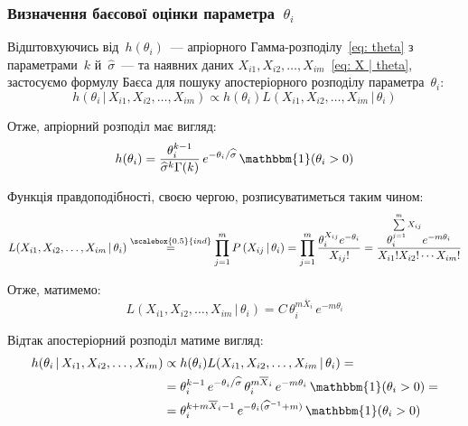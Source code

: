 \subsubsection*{Визначення баєсової оцінки параметра~$\theta_i$}

Відштовхуючись від~$h(\theta_i)$~--- апріорного Гамма-розподілу~\eqref{eq: theta} з параметрами~$k$ й~$\widehat{\sigma}$~--- та наявних даних $X_{i1},X_{i2},\ldots,X_{im}$~\eqref{eq: X | theta}, застосуємо формулу Баєса для пошуку апостеріорного розподілу параметра~$\theta_i:$
\begin{equation}
    h(\theta_i \,|\, X_{i1},X_{i2},\ldots,X_{im}) \propto h(\theta_i) L(X_{i1},X_{i2},\ldots,X_{im} \,|\, \theta_i)
\end{equation}

Отже, апріорний розподіл має вигляд:
\begin{equation}
    h(\theta_i) = \frac{\theta_{i}^{k-1}}{\widehat{\sigma}^{k}\Gamma(k)}\, e^{-\theta_{i}/\widehat{\sigma}}\, \mathbbm{1}(\theta_{i}>0)
\end{equation}

Функція правдоподібності, своєю чергою, розписуватиметься таким чином: 
\begin{equation}
    L(X_{i1},X_{i2},\ldots,X_{im} \,|\, \theta_i) \overset{\scalebox{0.5}{ind}}{=} \prod\limits_{j=1}^{m} P\left( X_{ij} \,|\, \theta_{i} \right) = \prod\limits_{j=1}^{m} \frac{\theta_{i}^{X_{ij}}e^{-\theta_{i}}}{X_{ij}!} = \frac{\theta_{i}^{\sum\limits_{j=1}^{m}X_{ij}}e^{-m\theta_{i}}}{X_{i1}!X_{i2}! \cdots X_{im}!}
\end{equation}

Отже, матимемо:
\begin{equation}
    L(X_{i1},X_{i2},\ldots,X_{im} \,|\, \theta_i) = C\, \theta_{i}^{m\overline{X}_i}\, e^{-m\theta_{i}}
\end{equation}

Відтак апостеріорний розподіл матиме вигляд:
\begin{align}
    h(\theta_i \,|\, X_{i1},X_{i2},\ldots,X_{im}) &\propto h(\theta_i) L(X_{i1},X_{i2},\ldots,X_{im} \,|\, \theta_i) = \notag \\
    & = \theta_{i}^{k-1}\, e^{-\theta_{i}/\widehat{\sigma}}\, \theta_{i}^{m\overline{X}_i}\, e^{-m\theta_{i}}\, \mathbbm{1}(\theta_{i}>0) = \notag \\
    & = \theta_{i}^{k+m\overline{X}_i-1}\, e^{-\theta_{i}(\widehat{\sigma}^{-1}+m)}\, \mathbbm{1}(\theta_{i}>0) \label{eq: theta posterior}
\end{align}

